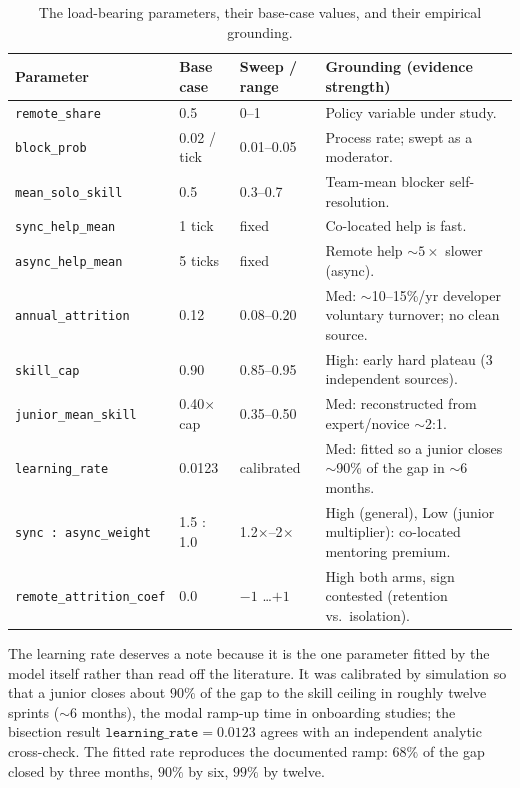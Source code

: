 \documentclass[11pt,a4paper]{article}
\begin{document}
\begin{table}[H]
\centering
\caption{The load-bearing parameters, their base-case values, and their empirical grounding.}
\label{tab:params}
\small
\setlength{\tabcolsep}{4pt}
\begin{tabular}{lllp{5.6cm}}
\toprule
Parameter & Base case & Sweep / range & Grounding (evidence strength) \\
\midrule
\texttt{remote\_share}          & 0.5         & 0--1            & Policy variable under study. \\
\texttt{block\_prob}            & 0.02 / tick & 0.01--0.05      & Process rate; swept as a moderator. \\
\texttt{mean\_solo\_skill}      & 0.5         & 0.3--0.7        & Team-mean blocker self-resolution. \\
\texttt{sync\_help\_mean}       & 1 tick      & fixed           & Co-located help is fast. \\
\texttt{async\_help\_mean}      & 5 ticks     & fixed           & Remote help $\sim 5\times$ slower (async). \\
\texttt{annual\_attrition}      & 0.12        & 0.08--0.20      & Med: $\sim$10--15\%/yr developer voluntary turnover; no clean source. \\
\texttt{skill\_cap}             & 0.90        & 0.85--0.95      & High: early hard plateau (3 independent sources). \\
\texttt{junior\_mean\_skill}    & 0.40$\times$cap & 0.35--0.50  & Med: reconstructed from expert/novice $\sim$2:1. \\
\texttt{learning\_rate}         & 0.0123      & calibrated      & Med: fitted so a junior closes $\sim$90\% of the gap in $\sim$6 months. \\
\texttt{sync\,:\,async\_weight} & 1.5 : 1.0   & 1.2$\times$--2$\times$ & High (general), Low (junior multiplier): co-located mentoring premium. \\
\texttt{remote\_attrition\_coef}& 0.0         & $-1$ \ldots $+1$ & High both arms, sign contested (retention vs.\ isolation). \\
\bottomrule
\end{tabular}
\end{table}

The learning rate deserves a note because it is the one parameter fitted by the model itself rather
than read off the literature. It was calibrated by simulation so that a junior closes about $90\%$ of
the gap to the skill ceiling in roughly twelve sprints ($\sim$6 months), the modal ramp-up time in
onboarding studies; the bisection result $\texttt{learning\_rate}=0.0123$ agrees with an independent
analytic cross-check. The fitted rate reproduces the documented ramp: $68\%$ of the gap closed by
three months, $90\%$ by six, $99\%$ by twelve.
\end{document}
